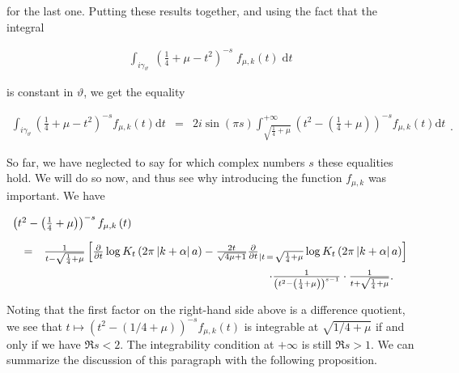 \documentclass{jams-l}
\theoremstyle{definition}
\theoremstyle{remark}
\numberwithin{equation}{section}
\begin{document}
        \noindent for the last one. Putting these results together, and using the fact that the integral
        
        \[ \begin{array}{c}
                \int_{i \gamma_{\vartheta}} \; \left( \frac{1}{4} + \mu - t^2 \right)^{-s} \; f_{\mu,k} \left( t \right) \; \text{d}t
            \end{array} \]
        
        \noindent is constant in $\vartheta$, we get the equality
        
        \[ \begin{array}{lll}
                \int_{i \gamma_{\vartheta}} \left( \frac{1}{4} + \mu - t^2 \right)^{-s} f_{\mu,k} \left( t \right) \text{d}t & = & 2 i \sin \left( \pi s \right) \int_{\sqrt{\frac{1}{4}+\mu}}^{+\infty} \left( t^2 - \left( \frac{1}{4} + \mu \right) \right)^{-s} f_{\mu,k} \left( t \right) \text{d}t
            \end{array} . \]
        
        So far, we have neglected to say for which complex numbers $s$ these equalities hold. We will do so now, and thus see why introducing the function $f_{\mu,k}$ was important. We have
        
        \[ \begin{array}{lll}
                \multicolumn{3}{l}{\left( t^2 - \left( \frac{1}{4} + \mu \right) \right)^{-s} f_{\mu,k} \left( t \right)} \\[1em]
                
                & = & \frac{1}{t - \sqrt{\frac{1}{4} + \mu}} \left[ \frac{\partial}{\partial t} \log K_t \left( 2 \pi \left \vert k + \alpha \right \vert a \right) - \frac{2t}{\sqrt{4 \mu + 1}}\frac{\partial}{\partial t}_{\vert t \, = \, \sqrt{\frac{1}{4}+\mu}} \log K_t \left( 2 \pi \left \vert k + \alpha \right \vert a \right) \right] \\[1em]
                
                && \qquad \qquad \qquad \qquad \qquad \qquad \qquad \qquad \qquad \qquad \cdot \frac{1}{\left( t^2 - \left( \frac{1}{4} + \mu \right) \right)^{s-1}} \cdot \frac{1}{t + \sqrt{\frac{1}{4}+\mu}} .
            \end{array} \]
        
        \noindent Noting that the first factor on the right-hand side above is a difference quotient, we see that $t \mapsto \left( t^2 - \left( 1/4 + \mu \right) \right)^{-s} f_{\mu,k} \left( t \right)$ is integrable at $\sqrt{1/4 + \mu}$ if and only if we have $\Re s < 2$. The integrability condition at $+ \infty$ is still $\Re s > 1$. We can summarize the discussion of this paragraph with the following proposition.
        
\end{document}
